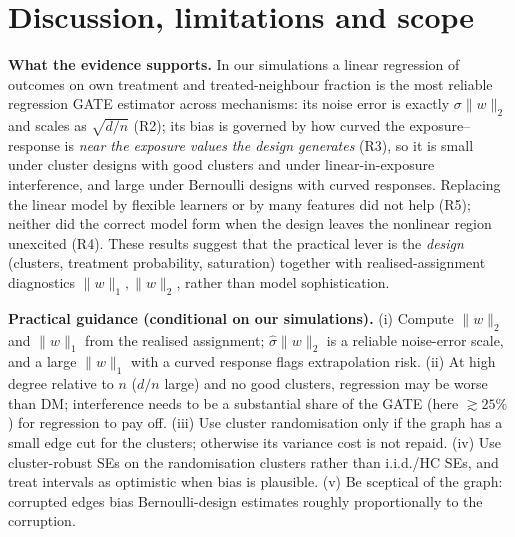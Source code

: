 \section{Discussion, limitations and scope}\label{sec:disc}
\textbf{What the evidence supports.} In our simulations a linear regression of outcomes on own treatment and treated-neighbour fraction is the most reliable regression GATE estimator across mechanisms: its noise error is exactly $\sigma\|w\|_2$ and scales as $\sqrt{d/n}$ (R2); its bias is governed by how curved the exposure--response is \emph{near the exposure values the design generates} (R3), so it is small under cluster designs with good clusters and under linear-in-exposure interference, and large under Bernoulli designs with curved responses. Replacing the linear model by flexible learners or by many features did not help (R5); neither did the correct model form when the design leaves the nonlinear region unexcited (R4). These results suggest that the practical lever is the \emph{design} (clusters, treatment probability, saturation) together with realised-assignment diagnostics $\|w\|_1,\|w\|_2$, rather than model sophistication.

\textbf{Practical guidance (conditional on our simulations).} (i) Compute $\|w\|_2$ and $\|w\|_1$ from the realised assignment; $\hat\sigma\|w\|_2$ is a reliable noise-error scale, and a large $\|w\|_1$ with a curved response flags extrapolation risk. (ii) At high degree relative to $n$ ($d/n$ large) and no good clusters, regression may be worse than DM; interference needs to be a substantial share of the GATE (here $\gtrsim25\%$) for regression to pay off. (iii) Use cluster randomisation only if the graph has a small edge cut for the clusters; otherwise its variance cost is not repaid. (iv) Use cluster-robust SEs on the randomisation clusters rather than i.i.d./HC SEs, and treat intervals as optimistic when bias is plausible. (v) Be sceptical of the graph: corrupted edges bias Bernoulli-design estimates roughly proportionally to the corruption.

